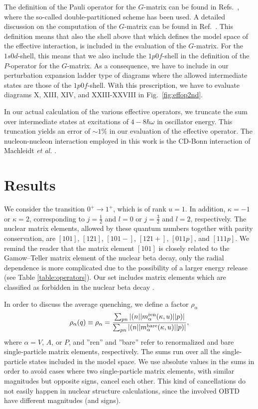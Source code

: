The definition of the Pauli operator for the $G$-matrix can be found
in Refs.\ \cite{kkko76,hko95}, where the so-called double-partitioned
scheme has been used. A detailed discussion
on the computation of the $G$-matrix can be found in Ref.~\cite{hko95}.
This definition means that also the shell above that which defines
the model space of the effective interaction, is included in the
evaluation of the $G$-matrix. For the $1s0d$-shell, this means that we
also include the $1p0f$-shell in the definition of the $P$-operator for 
the $G$-matrix.
As a consequence, we have to include in our perturbation expansion
ladder type of diagrams
where the allowed intermediate states are those of the $1p0f$-shell.
With this prescription, we have to evaluate  diagrams X, XIII, XIV, and
XXIII-XXVIII in Fig.\ \ref{fig:effop2nd}.

In our actual calculation of the various effective operators, we truncate
the sum over intermediate states at excitations of $4-8\hbar\omega$
in oscillator energy. This truncation yields an error of $\sim 1\%$
in our evaluation of the effective operator.  
The nucleon-nucleon interaction employed in this work is the 
CD-Bonn interaction of Machleidt {\em et al.} \cite{mac96}.

\section{Results}\label{Sec:res}

We consider the transition $0^+\to 1^+$, which is of rank
$u=1$. In addition, $\kappa=-1$ or $\kappa=2$, corresponding to
$j=\frac{1}{2}$ and $l=0$ or $j=\frac{3}{2}$ and
$l=2$, respectively. The nuclear matrix elements, allowed by these
quantum numbers together with parity conservation, are $[101]$, $[121]$,
$[101-]$, $[121+]$, $[011p]$, and $[111p]$. We remind the reader that the
matrix element $[101]$ is closely related to the Gamow--Teller matrix
element of the nuclear beta decay, only the radial dependence is more
complicated due to the possibility of a larger energy release (see Table
\ref{table:operators}). Our set includes matrix elements which are classified 
as forbidden in the nuclear beta decay \cite{mor60}.

In order to discuss the average quenching, we define a factor $\rho_\alpha$
\begin{equation}\label{rho}
  \rho_\alpha(q)\equiv\rho_\alpha=\frac{\sum_{pn}|(n||m_\alpha^{\rm
      ren}(\kappa,u)||p)|}{\sum_{pn}|(n||m_\alpha^{\rm bare}(\kappa,u)
      ||p)|},
\end{equation}
where $\alpha=V$, $A$, or $P$, and ''ren'' and ''bare'' refer to renormalized and
bare single-particle matrix elements, respectively. The sums run over all
the single-particle states included in the model space. We use absolute
values in the sums in order to avoid cases where two single-particle
matrix elements, with similar magnitudes but  opposite signs, cancel each
other. This kind of cancellations do not easily happen in nuclear
structure calculations, since the involved OBTD have different
magnitudes (and signs).

